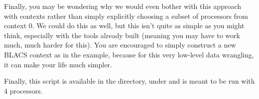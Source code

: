 Finally, you may be wondering why we would even bother with this approach with contexts rather than simply explicitly choosing a subset of processors from context 0.  We could do this as well, but this isn't quite as simple as you might think, especially with the tools already built (meaning you may have to work much, much harder for this).  You are encouraged to simply construct a new BLACS context as in the example, because for this very low-level data wrangling, it can make your life much simpler.

Finally, this script is available in the  directory, under  and is meant to be run with 4 processors.
